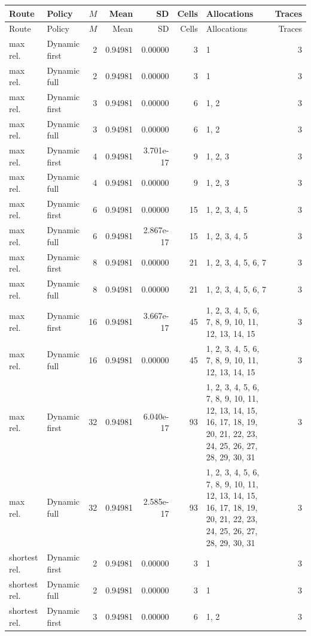 \documentclass[10pt,a4paper]{article}
\begin{document}
\tiny\setlength{\tabcolsep}{2pt}\begin{longtable}{@{}p{23mm}p{29mm}rrrrp{36mm}r@{}}
\toprule Route & Policy & $M$ & Mean & SD & Cells & Allocations & Traces \\ \midrule\endfirsthead
\toprule Route & Policy & $M$ & Mean & SD & Cells & Allocations & Traces \\ \midrule\endhead
\bottomrule\endfoot
max rel. & Dynamic first & 2 & 0.94981 & 0.00000 & 3 & 1 & 3 \\
max rel. & Dynamic full & 2 & 0.94981 & 0.00000 & 3 & 1 & 3 \\
max rel. & Dynamic first & 3 & 0.94981 & 0.00000 & 6 & 1, 2 & 3 \\
max rel. & Dynamic full & 3 & 0.94981 & 0.00000 & 6 & 1, 2 & 3 \\
max rel. & Dynamic first & 4 & 0.94981 & 3.701e-17 & 9 & 1, 2, 3 & 3 \\
max rel. & Dynamic full & 4 & 0.94981 & 0.00000 & 9 & 1, 2, 3 & 3 \\
max rel. & Dynamic first & 6 & 0.94981 & 0.00000 & 15 & 1, 2, 3, 4, 5 & 3 \\
max rel. & Dynamic full & 6 & 0.94981 & 2.867e-17 & 15 & 1, 2, 3, 4, 5 & 3 \\
max rel. & Dynamic first & 8 & 0.94981 & 0.00000 & 21 & 1, 2, 3, 4, 5, 6, 7 & 3 \\
max rel. & Dynamic full & 8 & 0.94981 & 0.00000 & 21 & 1, 2, 3, 4, 5, 6, 7 & 3 \\
max rel. & Dynamic first & 16 & 0.94981 & 3.667e-17 & 45 & 1, 2, 3, 4, 5, 6, 7, 8, 9, 10, 11, 12, 13, 14, 15 & 3 \\
max rel. & Dynamic full & 16 & 0.94981 & 0.00000 & 45 & 1, 2, 3, 4, 5, 6, 7, 8, 9, 10, 11, 12, 13, 14, 15 & 3 \\
max rel. & Dynamic first & 32 & 0.94981 & 6.040e-17 & 93 & 1, 2, 3, 4, 5, 6, 7, 8, 9, 10, 11, 12, 13, 14, 15, 16, 17, 18, 19, 20, 21, 22, 23, 24, 25, 26, 27, 28, 29, 30, 31 & 3 \\
max rel. & Dynamic full & 32 & 0.94981 & 2.585e-17 & 93 & 1, 2, 3, 4, 5, 6, 7, 8, 9, 10, 11, 12, 13, 14, 15, 16, 17, 18, 19, 20, 21, 22, 23, 24, 25, 26, 27, 28, 29, 30, 31 & 3 \\
shortest rel. & Dynamic first & 2 & 0.94981 & 0.00000 & 3 & 1 & 3 \\
shortest rel. & Dynamic full & 2 & 0.94981 & 0.00000 & 3 & 1 & 3 \\
shortest rel. & Dynamic first & 3 & 0.94981 & 0.00000 & 6 & 1, 2 & 3 \\

\end{longtable}
\end{document}
